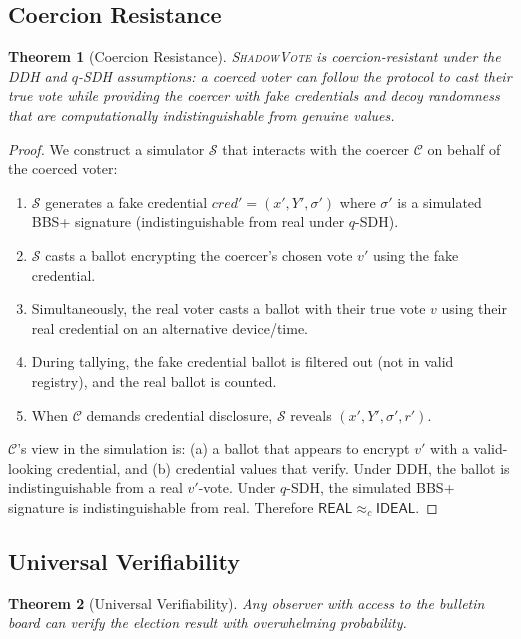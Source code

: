 \documentclass[11pt,a4paper]{article}
\newcommand{\shadow}{\textsc{ShadowVote}\xspace}
\newcommand{\CC}{\mathcal{C}}
\newtheorem{theorem}{Theorem}
\begin{document}
\subsection{Coercion Resistance}

\begin{theorem}[Coercion Resistance]
\shadow is coercion-resistant under the DDH and $q$-SDH assumptions: a coerced voter can follow the protocol to cast their true vote while providing the coercer with fake credentials and decoy randomness that are computationally indistinguishable from genuine values.
\end{theorem}

\begin{proof}
We construct a simulator $\mathcal{S}$ that interacts with the coercer $\CC$ on behalf of the coerced voter:

\begin{enumerate}
    \item $\mathcal{S}$ generates a fake credential $\mathit{cred}' = (x', Y', \sigma')$ where $\sigma'$ is a simulated BBS+ signature (indistinguishable from real under $q$-SDH).
    \item $\mathcal{S}$ casts a ballot encrypting the coercer's chosen vote $v'$ using the fake credential.
    \item Simultaneously, the real voter casts a ballot with their true vote $v$ using their real credential on an alternative device/time.
    \item During tallying, the fake credential ballot is filtered out (not in valid registry), and the real ballot is counted.
    \item When $\CC$ demands credential disclosure, $\mathcal{S}$ reveals $(x', Y', \sigma', r')$.
\end{enumerate}

$\CC$'s view in the simulation is: (a) a ballot that appears to encrypt $v'$ with a valid-looking credential, and (b) credential values that verify. Under DDH, the ballot is indistinguishable from a real $v'$-vote. Under $q$-SDH, the simulated BBS+ signature is indistinguishable from real. Therefore $\mathsf{REAL} \approx_c \mathsf{IDEAL}$.
\end{proof}

\subsection{Universal Verifiability}

\begin{theorem}[Universal Verifiability]
Any observer with access to the bulletin board can verify the election result with overwhelming probability.
\end{theorem}
\end{document}

